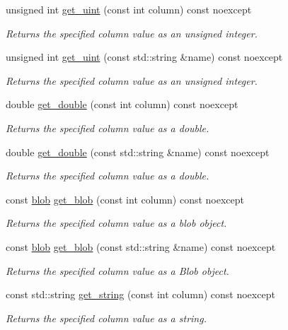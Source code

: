 \begin{DoxyCompactItemize}
unsigned int \hyperlink{a00010_a02e09a2778e2f4d146ef02cd6c9e86df}{get\-\_\-uint} (const int column) const noexcept
\begin{DoxyCompactList}\small\item\em Returns the specified column value as an unsigned integer. \end{DoxyCompactList}\item 
unsigned int \hyperlink{a00010_a662bad64308f5995cb03a0ccb772acdc}{get\-\_\-uint} (const std\-::string \&name) const noexcept
\begin{DoxyCompactList}\small\item\em Returns the specified column value as an unsigned integer. \end{DoxyCompactList}\item 
double \hyperlink{a00010_aa4052f3e593580c81ba2b8622e2652eb}{get\-\_\-double} (const int column) const noexcept
\begin{DoxyCompactList}\small\item\em Returns the specified column value as a double. \end{DoxyCompactList}\item 
double \hyperlink{a00010_a0613aae6ee73cd54d7f7d0d711494737}{get\-\_\-double} (const std\-::string \&name) const noexcept
\begin{DoxyCompactList}\small\item\em Returns the specified column value as a double. \end{DoxyCompactList}\item 
const \hyperlink{a00002}{blob} \hyperlink{a00010_abd1b75c884158222778d2d6ec8b9ec18}{get\-\_\-blob} (const int column) const noexcept
\begin{DoxyCompactList}\small\item\em Returns the specified column value as a blob object. \end{DoxyCompactList}\item 
const \hyperlink{a00002}{blob} \hyperlink{a00010_a3a94b5c5a0d153ca7e2f0ef6719dfc9a}{get\-\_\-blob} (const std\-::string \&name) const noexcept
\begin{DoxyCompactList}\small\item\em Returns the specified column value as a Blob object. \end{DoxyCompactList}\item 
const std\-::string \hyperlink{a00010_a8716fe92a821ebc0799097bd6cc6d53c}{get\-\_\-string} (const int column) const noexcept
\begin{DoxyCompactList}\small\item\em Returns the specified column value as a string. \end{DoxyCompactList}\item 

\end{DoxyCompactItemize}
